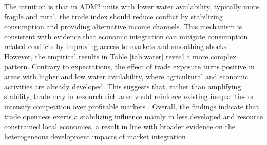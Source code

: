 The intuition is that in ADM2 units with lower water availability, typically more fragile and rural, the trade index should reduce conflict by stabilizing consumption and providing alternative income channels. This mechanism is consistent with evidence that economic integration can mitigate consumption related conflicts by improving access to markets and smoothing shocks \parencite{amodio2024trade}. \\

However, the empirical results in Table \ref{tab:water} reveal a more complex pattern. Contrary to expectations, the effect of trade exposure turns positive in areas with higher and low water availability, where agricultural and economic activities are already developed. This suggests that, rather than amplifying stability, trade may in resourch rich area vould reinforce existing inequalities or intensify competition over profitable markets \parencite{berman2017mine, michalopoulos2013pre}. Overall, the findings indicate that trade openness exerts a stabilizing influence mainly in less developed and resource constrained local economies, a result in line with broader evidence on the heterogeneous development impacts of market integration \parencite{dixcarneiro2023globalization, amodio2024trade}.